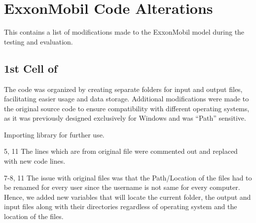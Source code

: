 \chapter{ExxonMobil Code Alterations}
\label{ch:appendixexxonmobil}
This \appendixname{} contains a list of modifications made to the ExxonMobil model during the testing and evaluation.

\section{1st Cell of }

The code was organized by creating separate folders for input and output files, facilitating easier usage and data storage. Additional modifications were made to the original source code to ensure compatibility with different operating systems, as it was previously designed exclusively for Windows and was ``Path'' sensitive.

\begin{codemodifications}

\begin{codemodification}{1}
Importing  library for further use.
\end{codemodification}

\begin{codemodification}{5, 11}
The lines which are from original file were commented out and replaced with new code lines.
\end{codemodification}

\begin{codemodification}{7-8, 11}
The issue with original files was that the Path/Location of the files had to be renamed for every user since the username is not same for every computer. Hence, we added new variables that will locate the current folder, the output and input files along with their directories regardless of operating system and the location of the files.
\end{codemodification}

\end{codemodifications}

